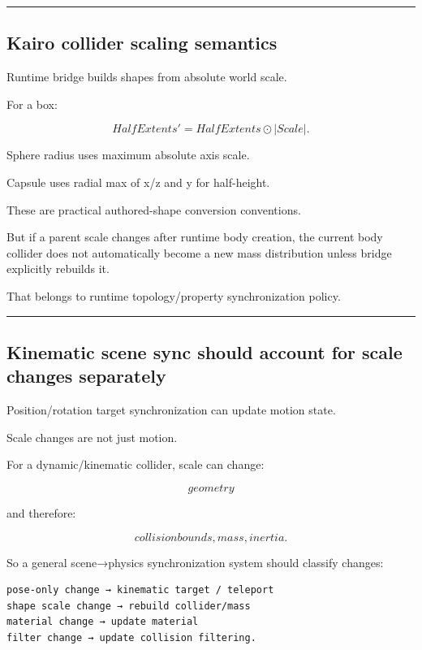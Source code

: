 \begin{center}\rule{0.5\linewidth}{0.5pt}\end{center}

\subsection{Kairo collider scaling semantics}\label{06-engine-ii-ch038-kairo-collider-scaling-semantics}

Runtime bridge builds shapes from absolute world scale.

For a box:

\[
HalfExtents'
=
HalfExtents\odot|Scale|.
\]

Sphere radius uses maximum absolute axis scale.

Capsule uses radial max of x/z and y for half-height.

These are practical authored-shape conversion conventions.

But if a parent scale changes after runtime body creation, the current body collider does not automatically become a new mass distribution unless bridge explicitly rebuilds it.

That belongs to runtime topology/property synchronization policy.

\begin{center}\rule{0.5\linewidth}{0.5pt}\end{center}

\subsection{Kinematic scene sync should account for scale changes separately}\label{06-engine-ii-ch038-kinematic-scene-sync-should-account-for-scale-changes-separately}

Position/rotation target synchronization can update motion state.

Scale changes are not just motion.

For a dynamic/kinematic collider, scale can change:

\[
geometry
\]

and therefore:

\[
collision bounds,
mass,
inertia.
\]

So a general scene→physics synchronization system should classify changes:

\begin{verbatim}
pose-only change → kinematic target / teleport
shape scale change → rebuild collider/mass
material change → update material
filter change → update collision filtering.
\end{verbatim}

